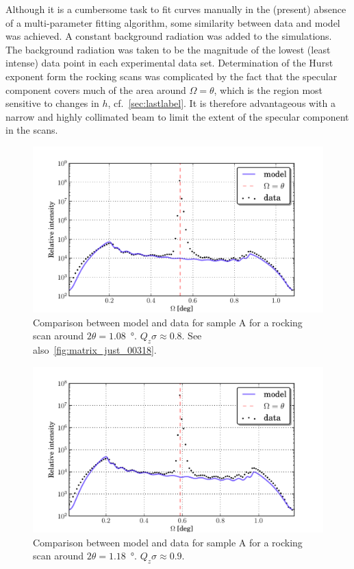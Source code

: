 \documentclass[10pt,twoside, b5paper,pdftex]{report}
\begin{document}
Although it is a cumbersome task to fit curves manually in the (present) absence of a multi-parameter fitting algorithm, some similarity between data and model was achieved. A constant background radiation was added to the simulations. The background radiation was taken to be the magnitude of the lowest (least intense) data point in each experimental data set. Determination of the Hurst exponent form the rocking scans was complicated by the fact that the specular component covers much of the area around $\Omega = \theta$, which is the region most sensitive to changes in $h$, cf.~\cref{sec:lastlabel}. It is therefore advantageous with a narrow and highly collimated beam to limit the extent of the specular component in the scans.
%
\begin{figure}[htbp]
	\begin{center}
		\includegraphics[width=1.0\textwidth]{figures/74_just_00318.pdf}
	\end{center}
	\caption{Comparison between model and data for sample A for a rocking scan around $2\theta = 1.08$~\si{\degree}. $Q_z\sigma \approx 0.8$.  See also~\cref{fig:matrix_just_00318}.\label{fig:just_00318}}
\end{figure}
\begin{figure}[htbp]
	\begin{center}
		\includegraphics[width=1.0\textwidth]{figures/74_just_00319.pdf}
	\end{center}
	\caption{Comparison between model and data for sample A for a rocking scan around $2\theta = 1.18$~\si{\degree}. $Q_z\sigma \approx 0.9$. \label{fig:just_00319}}
\end{figure}
\end{document}
